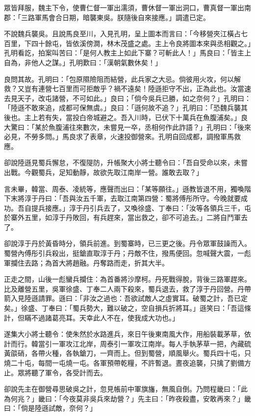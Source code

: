 眾皆拜服，魏主下令，使曹仁督一軍出濡須，曹休督一軍出洞口，曹真督一軍出南郡：「三路軍馬會合日期，暗襲東吳。朕隨後自來接應。」調遣已定。

不說魏兵襲吳。且說馬良至川，入見孔明，呈上圖本而言曰：「今移營夾江橫占七百里，下四十餘屯，皆依溪傍澗，林木茂盛之處。主上令良將圖本來與丞相觀之。」孔明看訖，拍案叫苦曰：「是何人教主上如此下寨？可斬此人！」馬良曰：「皆主上自為，非他人之謀。」孔明歎曰：「漢朝氣數休矣！」

良問其故。孔明曰：「包原隰險阻而結營，此兵家之大忌。倘彼用火攻，何以解救？又豈有連營七百里而可拒敵乎？禍不遠矣！陸遜拒守不出，正為此也。汝當速去見天子，改屯諸營，不可如此。」良曰；「倘今吳兵已勝，如之奈何？」孔明曰：「陸遜不敢來追，成都可保無虞。」良曰：「遜何故不追？」孔明曰：「恐魏兵襲其後也。主上若有失，當投白帝城避之。吾入川時，已伏下十萬兵在魚腹浦矣。」良大驚曰：「某於魚腹浦往來數次，未嘗見一卒，丞相何作此詐語？」孔明曰：「後來必見，不勞多問。」馬良求了表章，火速投御營來。孔明自回成都，調撥軍馬救應。

卻說陸遜見蜀兵懈怠，不復隄防，升帳聚大小將士聽令曰：「吾自受命以來，未嘗出戰。今觀蜀兵，足知動靜，故欲先取江南岸一營。誰敢去取？」

言未畢，韓當、周泰、凌統等，應聲而出曰：「某等願往。」遜教皆退不用，獨喚階下末將淳于丹曰：「吾與汝五千軍，去取江南第四營：蜀將傅彤所守。今晚就要成功。吾自提兵接應。」淳于丹引兵去了，又喚徐盛、丁奉曰：「汝等各領兵三千，屯於寨外五里，如淳于丹敗回，有兵趕來，當出救之，卻不可追去。」二將自鬥軍去了。

卻說淳于丹於黃昏時分，領兵前進。到蜀寨時，已三更之後。丹令眾軍鼓譟而入。蜀營內傅彤引兵殺出，挺鎗直取淳于丹；丹敵不住，撥馬便回。忽喊聲大震，一彪軍攔住去路；為首大將趙融。丹奪路而走，折其大半。

正走之間，山後一彪蠻兵攔住：為首番將沙摩柯。丹死戰得脫，背後三路軍趕來。比及離營五里，吳軍徐盛、丁奉二人兩下殺來，蜀兵退去，救了淳于丹回營。丹帶箭入見陸遜請罪。遜曰：「非汝之過也：吾欲試敵人之虛實耳。破蜀之計，吾已定矣。」徐盛、丁奉曰：「蜀兵勢大，難以破之，空自損兵折將耳。」遜笑曰：「吾這條計，但瞞不過諸葛亮耳。天幸此人不在，使我成大功也。」

遂集大小將士聽令：使朱然於水路進兵，來日午後東南風大作，用船裝載茅草，依計而行。韓當引一軍攻江北岸，周泰引一軍攻江南岸。每人手執茅草一把，內藏硫黃燄硝，各帶火種，各執鎗刀，一齊而上。但到蜀營，順風舉火。蜀兵四十屯，只燒二十屯，每間一屯燒一屯。各軍預帶乾糧，不許暫退。晝夜追襲，只擒了劉備方止。眾將聽了軍令，各受計而去。

卻說先主在御營尋思破吳之計，忽見帳前中軍旗旛，無風自倒。乃問程畿曰：「此為何兆？」畿曰：「今夜莫非吳兵來劫營？」先主曰：「昨夜殺盡，安敢再來？」畿曰：「倘是陸遜試敵，奈何？」

